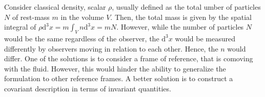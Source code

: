 Consider classical density, scalar $\rho$, usually defined as the 
total umber of particles $N$ of rest-mass $m$ in the volume $V$. 
Then, the total mass is given by the 
spatial integral of $\rho \text{d}^3x = m\int_V n \text{d}^3 x = mN$. 
However, while the number of particles $N$ would be the same regardless of the observer, 
the $\text{d}^3x$ would be measured differently by observers moving in relation to each other. 
Hence, the $n$ would differ. 
One of the solutions is to consider a frame of reference, that is comoving with the fluid.
However, this would hinder the ability to generalize the formulation to other reference frames.
A better solution is to construct a covariant description in terms of invariant quantities.
%
%
%
